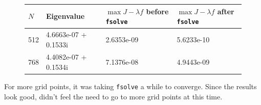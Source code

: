 \documentclass[12pt]{article}
\begin{document}
\begin{figure}[H]
\begin{tabular}{l|lll}
  $N$   & Eigenvalue &  $\max J -\lambda f$ before \texttt{fsolve}  &  $\max J -\lambda f$ after \texttt{fsolve} \\ \hline
  512   &   4.6663e-07 +  0.1533i &   2.6353e-09  &  5.6233e-10   \\ 
  768   &   4.4082e-07 +  0.1534i &   7.1376e-08  &  4.9443e-09   \\
\end{tabular}
\end{figure}

For more grid points, it was taking \texttt{fsolve} a while to converge. Since the results look good, didn't feel the need to go to more grid points at this time.\\
\end{document}
